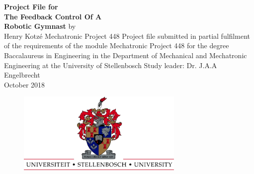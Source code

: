 
\begin{titlingpage}
	
	{	\centering
		\vfill
		\textbf{\Huge
			Project File for \\
			The Feedback Control Of A\\ 
			\vskip0.5cm
			Robotic Gymnast}
		\vskip0.5cm
		\normalsize by \\
		\vskip0.5cm
		\Large Henry Kotz\'{e} 
		\vskip1cm
		\large Mechatronic Project 448 
		\vskip2cm
		\small Project file submitted in partial fulfilment of the requirements of
		the module Mechatronic Project 448 for the degree Baccalaureus in
		Engineering in the Department of Mechanical and Mechatronic
		Engineering at the University of Stellenbosch 
		\vskip2cm
		\large Study leader: Dr. J.A.A Engelbrecht\\
		\vskip2cm
			\large October 2018\\
	}    
	\vfill
	\begin{figure}[t!]
		\includegraphics[width=8cm]{UScrest-top.eps}
		\centering
		\vskip0.5cm
	\end{figure}
	\vfill
	\vfill
\end{titlingpage}